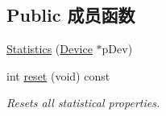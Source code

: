 \subsection*{Public 成员函数}
\begin{DoxyCompactItemize}
\item 
\hyperlink{classmv_i_m_p_a_c_t_1_1acquire_1_1_statistics_aade00e306b719630ce5c77301b070fcf}{Statistics} (\hyperlink{classmv_i_m_p_a_c_t_1_1acquire_1_1_device}{Device} $\ast$p\+Dev)
\item 
int \hyperlink{classmv_i_m_p_a_c_t_1_1acquire_1_1_statistics_adc21a9add6973f8f829f751e616b0a43}{reset} (void) const 
\begin{DoxyCompactList}\small\item\em Resets all statistical properties. \end{DoxyCompactList}\end{DoxyCompactItemize}
